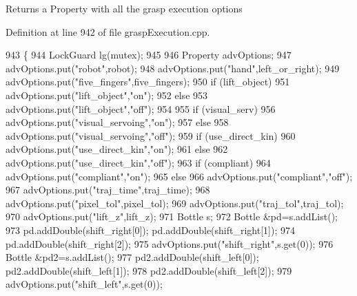 \begin{DoxyReturn}{Returns}
a Property with all the grasp execution options 
\end{DoxyReturn}


Definition at line 942 of file grasp\+Execution.\+cpp.


\begin{DoxyCode}
943 \{
944     LockGuard lg(mutex);
945 
946     Property advOptions;
947     advOptions.put(\textcolor{stringliteral}{"robot"},robot);
948     advOptions.put(\textcolor{stringliteral}{"hand"},left\_or\_right);
949     advOptions.put(\textcolor{stringliteral}{"five\_fingers"},five\_fingers);
950     \textcolor{keywordflow}{if} (lift\_object)
951         advOptions.put(\textcolor{stringliteral}{"lift\_object"},\textcolor{stringliteral}{"on"});
952     \textcolor{keywordflow}{else}
953         advOptions.put(\textcolor{stringliteral}{"lift\_object"},\textcolor{stringliteral}{"off"});
954 
955     \textcolor{keywordflow}{if} (visual\_serv)
956         advOptions.put(\textcolor{stringliteral}{"visual\_servoing"},\textcolor{stringliteral}{"on"});
957     \textcolor{keywordflow}{else}
958         advOptions.put(\textcolor{stringliteral}{"visual\_servoing"},\textcolor{stringliteral}{"off"});
959     \textcolor{keywordflow}{if} (use\_direct\_kin)
960         advOptions.put(\textcolor{stringliteral}{"use\_direct\_kin"},\textcolor{stringliteral}{"on"});
961     \textcolor{keywordflow}{else}
962         advOptions.put(\textcolor{stringliteral}{"use\_direct\_kin"},\textcolor{stringliteral}{"off"});
963     \textcolor{keywordflow}{if} (compliant)
964         advOptions.put(\textcolor{stringliteral}{"compliant"},\textcolor{stringliteral}{"on"});
965     \textcolor{keywordflow}{else}
966         advOptions.put(\textcolor{stringliteral}{"compliant"},\textcolor{stringliteral}{"off"});
967     advOptions.put(\textcolor{stringliteral}{"traj\_time"},traj\_time);
968     advOptions.put(\textcolor{stringliteral}{"pixel\_tol"},pixel_tol);
969     advOptions.put(\textcolor{stringliteral}{"traj\_tol"},traj\_tol);
970     advOptions.put(\textcolor{stringliteral}{"lift\_z"},lift\_z);
971     Bottle s;
972     Bottle &pd=s.addList();
973     pd.addDouble(shift\_right[0]); pd.addDouble(shift\_right[1]);
974     pd.addDouble(shift\_right[2]);
975     advOptions.put(\textcolor{stringliteral}{"shift\_right"},s.get(0));
976     Bottle &pd2=s.addList();
977     pd2.addDouble(shift\_left[0]); pd2.addDouble(shift\_left[1]);
978     pd2.addDouble(shift\_left[2]);
979     advOptions.put(\textcolor{stringliteral}{"shift\_left"},s.get(0));

\end{DoxyCode}
